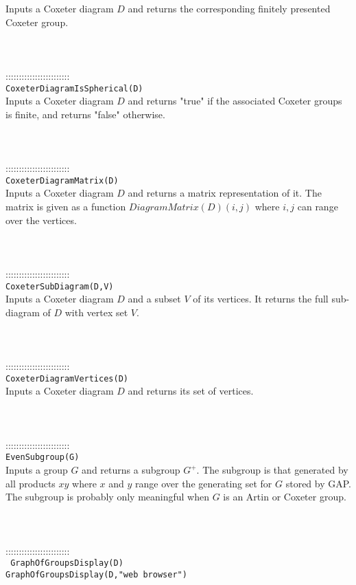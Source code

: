 \documentclass[a4paper,11pt]{report}
\begin{document}
{ Inputs a Coxeter diagram $D$ and returns the corresponding finitely presented Coxeter group. \\
 \\
 \\
 \\
 ::::::::::::::::::::::::\\
 \texttt{CoxeterDiagramIsSpherical(D) }\\
 

 Inputs a Coxeter diagram $D$ and returns "true" if the associated Coxeter groups is finite, and returns
"false" otherwise. \\
 \\
 \\
 \\
 ::::::::::::::::::::::::\\
 \texttt{CoxeterDiagramMatrix(D) }\\
 

 Inputs a Coxeter diagram $D$ and returns a matrix representation of it. The matrix is given as a function $DiagramMatrix(D)(i,j)$ where $i,j$ can range over the vertices. \\
 \\
 \\
 \\
 ::::::::::::::::::::::::\\
 \texttt{CoxeterSubDiagram(D,V) }\\
 

 Inputs a Coxeter diagram $D$ and a subset $V$ of its vertices. It returns the full sub-diagram of $D$ with vertex set $V$. \\
 \\
 \\
 \\
 ::::::::::::::::::::::::\\
 \texttt{CoxeterDiagramVertices(D) }\\
 

 Inputs a Coxeter diagram $D$ and returns its set of vertices. \\
 \\
 \\
 \\
 ::::::::::::::::::::::::\\
 \texttt{EvenSubgroup(G) }\\
 

 Inputs a group $G$ and returns a subgroup $G^+$. The subgroup is that generated by all products $xy$ where $x$ and $y$ range over the generating set for $G$ stored by GAP. The subgroup is probably only meaningful when $G$ is an Artin or Coxeter group. \\
 \\
 \\
 \\
 ::::::::::::::::::::::::\\
 \texttt{ GraphOfGroupsDisplay(D) }\\
 \texttt{GraphOfGroupsDisplay(D,"web browser") }\\
 

}
\end{document}
